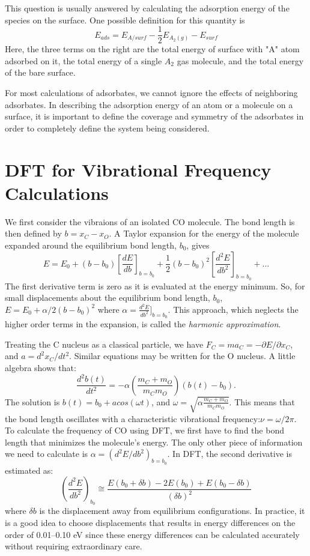 \documentclass[12pt]{article}
\begin{document}
This question is usually answered by calculating the adsorption energy of the species on the surface. One possible definition for this quantity is
\begin{equation}
    E_{ads}=E_{A/surf}-\frac{1}{2}E_{A_2(g)} - E_{surf}
\end{equation}
Here, the three terms on the right are the total energy of surface with "A" atom adsorbed on it, the total energy of a single $A_2$ gas molecule, and the total energy of the bare surface. 

For most calculations of adsorbates, we cannot ignore the effects of neighboring  adsorbates. In describing the adsorption energy of an atom or a molecule on a surface, it is important to define the coverage and symmetry of the adsorbates in order to completely define the system being considered.

\section{DFT for Vibrational Frequency Calculations}
We first consider the vibraions of an isolated CO molecule. The bond length is then defined by $b=x_C-x_O$. A Taylor expansion for the energy of the molecule expanded around the equilibrium bond length, $b_0$, gives
\begin{equation}
    E=E_0+(b-b_0)[\frac{dE}{db}]_{b=b_0}+\frac{1}{2}(b-b_0)^2[\frac{d^2E}{db^2}]_{b=b_0}+...
\end{equation}
The first derivative term is zero as it is evaluated at the energy minimum. So, for small displacements about the equilibrium bond length, $b_0$, $E=E_0+\alpha/2(b-b_0)^2$ where $\alpha=\frac{d^2E}{db^2}]_{b=b_0}$. This approach, which neglects the higher order terms in the expansion, is called the \textit{harmonic approximation}.

Treating the C nucleus as a classical particle, we have $F_C=ma_C=-\partial E/\partial x_C$, and $a=d^2x_C/dt^2$. Similar equations may be written for the O nucleus. A little algebra shows that:
\begin{equation}
    \frac{d^2b(t)}{dt^2}=-\alpha(\frac{m_C+m_O}{m_Cm_O})(b(t)-b_0).
\end{equation}
The solution is $b(t)=b_0+a cos(\omega t)$, and $\omega=\sqrt{\alpha\frac{m_C+m_O}{m_Cm_O}}$. This means that the bond length oscillates with a characteristic vibrational frequency:$\nu=\omega/2\pi$. To calculate the frequency of CO using DFT, we first have to find the bond length that minimizes the molecule's energy. The only other piece of information we need to calculate is $\alpha=(d^2E/db^2)_{b=b_0}$. In DFT, the second derivative is estimated as:
\begin{equation}
    (\frac{d^2E}{db^2})_{b_0}\cong\frac{E(b_0+\delta b)-2E(b_0)+E(b_0-\delta b)}{(\delta b)^2}
\end{equation}
where $\delta b$ is the displacement away from equilibrium configurations. In practice, it is a good idea to choose displacements that results in energy differences on the order of 0.01--0.10 eV since these energy differences can be calculated accurately without requiring extraordinary care.
\end{document}
